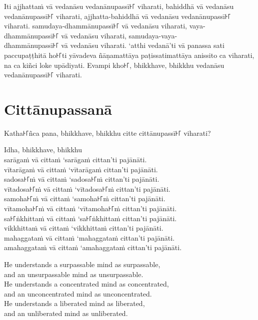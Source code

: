 \paliPage

Iti ajjhattaṁ vā vedanāsu vedanānupassī꜔꜒ viharati, bahiddhā vā vedanāsu
vedanānupassī꜔꜒ viharati, ajjhatta-bahiddhā vā vedanāsu vedanānupassī꜔꜒ viharati.
samudaya-dhammānupassī꜔꜒ vā vedanāsu viharati, vaya-dhammānupassī꜔꜒ vā vedanāsu
viharati, samudaya-vaya-\\
dhammānupassī꜔꜒ vā vedanāsu viharati. ‘atthi vedanā’ti vā panassa sati
paccupaṭṭhitā ho꜔꜒ti yāvadeva ñāṇamattāya paṭissatimattāya anissito ca viharati,
na ca kiñci loke upādiyati. Evampi kho꜔꜒, bhikkhave, bhikkhu vedanāsu
vedanānupassī꜔꜒ viharati.


\chapter*{Cittānupassanā}

Katha꜔꜒ñca pana, bhikkhave, bhikkhu citte cittānupassī꜔꜒ viharati?

Idha, bhikkhave, bhikkhu\\
sarāgaṁ vā cittaṁ ‘sarāgaṁ cittan’ti pajānāti.\\
vītarāgaṁ vā cittaṁ ‘vītarāgaṁ cittan’ti pajānāti.\\
sadosa꜔꜒ṁ vā cittaṁ ‘sadosa꜔꜒ṁ cittan’ti pajānāti.\\
vītadosa꜔꜒ṁ vā cittaṁ ‘vītadosa꜔꜒ṁ cittan’ti pajānāti.\\
samoha꜔꜒ṁ vā cittaṁ ‘samoha꜔꜒ṁ cittan’ti pajānāti.\\
vītamoha꜔꜒ṁ vā cittaṁ ‘vītamoha꜔꜒ṁ cittan’ti pajānāti.\\
sa꜔꜒ṅkhittaṁ vā cittaṁ ‘sa꜔꜒ṅkhittaṁ cittan’ti pajānāti.\\
vikkhittaṁ vā cittaṁ ‘vikkhittaṁ cittan’ti pajānāti.\\
mahaggataṁ vā cittaṁ ‘mahaggataṁ cittan’ti pajānāti.\\
amahaggataṁ vā cittaṁ ‘amahaggataṁ cittan’ti pajānāti.

\englishPage

He understands a surpassable mind as surpassable,\\
and an unsurpassable mind as unsurpassable.\\
He understands a concentrated mind as concentrated,\\
and an unconcentrated mind as unconcentrated.\\
He understands a liberated mind as liberated,\\
and an unliberated mind as unliberated.

